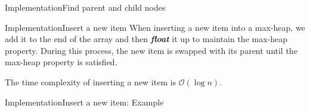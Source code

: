 \documentclass[aspectratio=169]{ctexbeamer}
\newcommand{\highlight}[1]{\textbf{\textit{#1}}}
\begin{document}
    \begin{frame}{Implementation}{Find parent and child nodes}
        \begin{algorithm}[H]
            \caption{Find parent and child nodes}
            \label{algo:Find parent and child nodes}
    
            \BlankLine
    
    
            \BlankLine
    
        \end{algorithm}
    \end{frame}

    \begin{frame}{Implementation}{Insert a new item}
        When inserting a new item into a max-heap, we add it to the end of the array and then \highlight{float} it up to maintain the max-heap property. During this process, the new item is swapped with its parent until the max-heap property is satisfied.

        The time complexity of inserting a new item is $\mathcal O(\log n)$.
    \end{frame}

    \begin{frame}{Implementation}{Insert a new item: Example}
        \begin{figure}[!htbp]
            \centering
        \end{figure}
    \end{frame}
\end{document}
